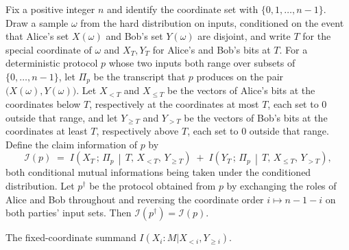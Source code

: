 \begin{theorem}
\label{CommunicationComplexity.Functions.Disjointness.RandomizedLowerBound.claimInfo_dualProtocol}
\leanok
{}
Fix a positive integer $n$ and identify the coordinate set with $\{0,1,\dots,n-1\}$.
Draw a sample $\omega$ from the hard distribution on inputs, conditioned on the event
that Alice's set $X(\omega)$ and Bob's set $Y(\omega)$ are disjoint, and write $T$ for
the special coordinate of $\omega$ and $X_T, Y_T$ for Alice's and Bob's bits at $T$. For
a deterministic protocol $p$ whose two inputs both range over subsets of
$\{0,\dots,n-1\}$, let $\Pi_p$ be the transcript that $p$ produces on the pair
$\bigl(X(\omega), Y(\omega)\bigr)$. Let $X_{<T}$ and $X_{\le T}$ be the vectors of
Alice's bits at the coordinates below $T$, respectively at the coordinates at most $T$,
each set to $0$ outside that range, and let $Y_{\ge T}$ and $Y_{>T}$ be the vectors of
Bob's bits at the coordinates at least $T$, respectively above $T$, each set to $0$
outside that range. Define the claim information of $p$ by
\[
\mathcal{I}(p) \;=\; I\!\left(X_T \,;\, \Pi_p \,\middle|\, T,\, X_{<T},\, Y_{\ge
T}\right) \;+\; I\!\left(Y_T \,;\, \Pi_p \,\middle|\, T,\, X_{\le T},\, Y_{>T}\right),
\]
both conditional mutual informations being taken under the conditioned distribution. Let
$p^{\dagger}$ be the protocol obtained from $p$ by exchanging the roles of Alice and Bob
throughout and reversing the coordinate order $i \mapsto n-1-i$ on both parties' input
sets. Then $\mathcal{I}(p^{\dagger}) = \mathcal{I}(p)$.
\end{theorem}

\begin{definition}[Fixedaliceinfoterm]
\label{CommunicationComplexity.Functions.Disjointness.RandomizedLowerBound.fixedAliceInfoTerm}
\leanok
{}
The fixed-coordinate summand $I(X_{i} : M | X_{<i}, Y_{≥i})$.
\end{definition}


